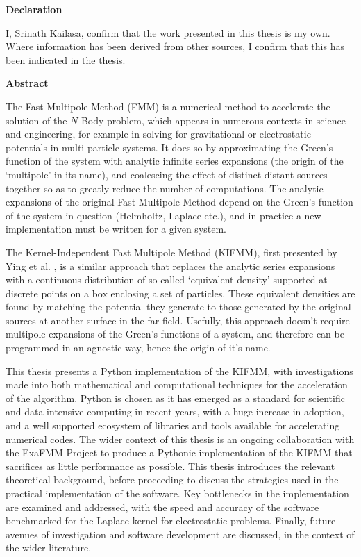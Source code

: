 \thispagestyle{plain}

\begin{center}
    \textbf{Declaration}
\end{center}
I, Srinath Kailasa, confirm that the work presented in this thesis is my own. Where information has been derived from other
sources, I confirm that this has been indicated in the thesis.

\begin{center}
    \textbf{Abstract}
\end{center}

The Fast Multipole Method (\gls{FMM}) is a numerical method to accelerate the solution
of the $N$-Body problem, which appears in numerous contexts in science and engineering,
for example in solving for gravitational or electrostatic potentials in multi-particle
systems. It does so by approximating the Green's function of the
system with analytic infinite series expansions (the origin of the `multipole' in its name),
and coalescing the effect of distinct distant sources together so as to
greatly reduce the number of computations. The analytic expansions of the
original Fast Multipole Method depend on the Green's function of the system in
question (Helmholtz, Laplace etc.), and in practice a new implementation
must be written for a given system.

The Kernel-Independent Fast Multipole Method (\gls{KIFMM}),
first presented by Ying et al. \cite{Ying:2004:JCP}, is a similar approach that replaces
the analytic series expansions with a continuous distribution of so called
`equivalent density' supported at discrete points on a box enclosing a set of
particles. These equivalent densities are found by matching the potential they
generate to those generated by the original sources at another surface in the
far field. Usefully, this approach doesn't require multipole expansions of the
Green's functions of a system, and therefore can be programmed in an agnostic way,
hence the origin of it's name.

This thesis presents a Python implementation of
the KIFMM, with investigations made into both mathematical and computational
techniques for the acceleration of the algorithm. Python is chosen as it has emerged as a standard
for scientific and data intensive computing in recent years, with a huge increase
in adoption, and a well supported ecosystem of libraries and tools available for
accelerating numerical codes. The wider context of this thesis
is an ongoing collaboration with the ExaFMM Project \cite{exafmm} to produce a Pythonic
implementation of the KIFMM that sacrifices as little performance as possible.
This thesis introduces the relevant theoretical background, before
proceeding to discuss the strategies used in the practical implementation of the
software. Key bottlenecks in the implementation are examined and addressed, with the speed
and accuracy of the software benchmarked for the Laplace kernel for electrostatic problems.
Finally, future avenues of investigation and software development are discussed, in the context
of the wider literature.
